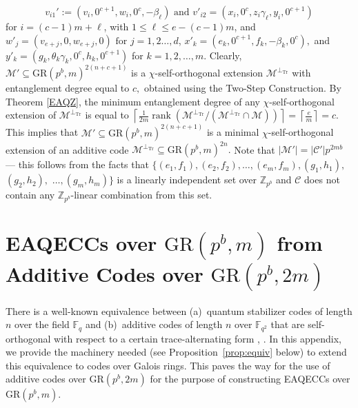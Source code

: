 \documentclass{article}
\DeclareMathOperator{\Tr}{Tr}
\DeclareMathOperator{\rank}{rank}
\theoremstyle{remark}
\theoremstyle{definition}
\numberwithin{equation}{section}
\begin{document}
  $$
 v_{i1}' := (v_i,0^{c+1},w_i,0^{c},-\beta_{\ell}) \text{ and }  v'_{i2} = (x_i,0^{c},z_{i}\gamma_{\ell},y_i,0^{c+1})
 $$ for $i = (c-1)m + \ell$, with $1 \le \ell \le e-(c-1)m$, and  $w'_j = (v_{e+j},0,w_{e+j},0) \text{ for } j=1,2\ldots,d$, $x'_k =(e_k,0^{c+1},f_k,-\beta_{k},0^{c}),$ and $y'_k=(g_k,\theta_k\gamma_{k},0^{c},h_k,0^{c+1})$ for $k=1,2,\ldots,m.$ Clearly, $\mathcal{M}'\subseteq \text{GR}(p^b,m)^{2(n+c+1)}$ is a $\chi$-self-orthogonal extension $\mathcal{M}^{\perp_{\Tr}} $ with entanglement degree equal to $c,$   obtained using the Two-Step Construction.  
 By Theorem \ref{EAQZ}, the minimum entanglement degree of any $\chi$-self-orthogonal extension of $\mathcal{M}^{\perp_{\Tr}}$ is equal to  $\left\lceil { \frac{1}{2m} \rank(\mathcal{M}^{\perp_{\Tr}}/(\mathcal{M}^{\perp_{\Tr}} \cap \mathcal{M}))  }\right\rceil=\left\lceil  \frac{e}{m}\right\rceil=c.$ This implies that $\mathcal{M}'\subseteq \text{GR}(p^b,m)^{2(n+c+1)}$ is a minimal $\chi$-self-orthogonal extension of an additive code $\mathcal{M}^{\perp_{\Tr}} \subseteq \text{GR}(p^b,m)^{2n}.$ 
Note that $|\mathcal{M}'|=|\mathcal{C}'|p^{2mb}$ --- this follows from the facts that $\{(e_1,f_1),(e_2,f_2),\ldots, (e_{m},f_{m}),(g_1,h_1),$ $(g_2,h_2),$ $\ldots, (g_{m},h_{m})\}$ is a linearly independent set over $\mathbb{Z}_{p^b}$ and $\mathcal{C}$ does not contain any $\mathbb{Z}_{p^b}$-linear combination from this set.


\section{EAQECCs over $\text{GR}(p^b,m)$ from Additive Codes over  $\text{GR}(p^b,2m)$}\label{app:trace-alt-form} 

There is a well-known equivalence between (a)~quantum stabilizer codes of length $n$ over the field $\mathbb{F}_q$ and (b)~additive codes of length $n$ over $\mathbb{F}_{q^2}$ that are self-orthogonal with respect to a certain trace-alternating form \cite{calder}, \cite[Section~IV-B]{ketkar}.
In this appendix, we provide the machinery needed (see Proposition~\ref{prop:equiv} below) to extend this equivalence to codes over Galois rings. This paves the way for the use of additive codes over $\text{GR}(p^b,2m)$ for the purpose of constructing EAQECCs over $\text{GR}(p^b,m).$ 
\end{document}
